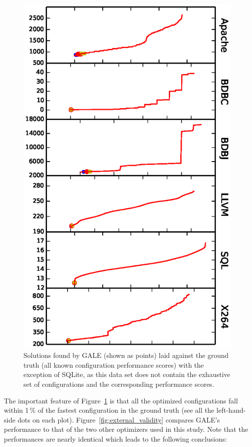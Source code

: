 \documentclass{sig-alternative}
\newcommand{\fig}[1]{Figure~\ref{fig:#1}}
\begin{document}
\begin{figure}[!t]
\includegraphics[width=0.9\linewidth]{Figures/optimizer_result.eps}
\caption{Solutions found by GALE (shown as points) laid against the ground truth (all known configuration performance scores) with the exception of SQLite, as this data set does not contain the exhaustive set of configurations and the corresponding performance scores.}\label{fig:performance_graph}
\end{figure}


The important feature of \fig{performance_graph} is that all the optimized configurations fall within 1\,\% of the fastest
configuration in the ground truth (see all the left-hand-side dots on each plot). \fig{external_validity} compares GALE's performance to that of the two other optimizers
used in this study. Note that the performances are nearly identical which leads to the following conclusions:
\end{document}
